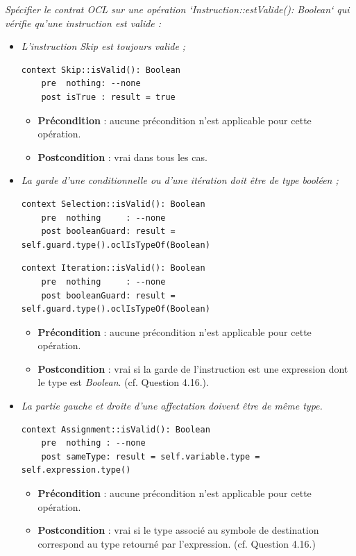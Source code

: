 \documentclass[oneside,a4paper]{book}
\begin{document}
\textit{Spécifier le contrat OCL sur une opération `Instruction::estValide(): Boolean` qui vérifie qu'une instruction est valide :}
\begin{itemize}
    \item \textit{L'instruction Skip est toujours valide ;}
        \begin{lstlisting}
context Skip::isValid(): Boolean
    pre  nothing: --none
    post isTrue : result = true
        \end{lstlisting}
        \begin{itemize}
            \item \textbf{Précondition} : aucune précondition n'est applicable pour cette opération.
            \item \textbf{Postcondition} : vrai dans tous les cas.
        \end{itemize}
    
    \item \textit{La garde d'une conditionnelle ou d'une itération doit être de type booléen ;}
        \begin{lstlisting}
context Selection::isValid(): Boolean
    pre  nothing     : --none
    post booleanGuard: result = self.guard.type().oclIsTypeOf(Boolean)
        \end{lstlisting}
        \begin{lstlisting}
context Iteration::isValid(): Boolean
    pre  nothing     : --none
    post booleanGuard: result = self.guard.type().oclIsTypeOf(Boolean)
        \end{lstlisting}
        \begin{itemize}
            \item \textbf{Précondition} : aucune précondition n'est applicable pour cette opération.
            \item \textbf{Postcondition} : vrai si la garde de l'instruction est une expression dont le type est \textit{Boolean}.\newline
            (cf. Question 4.16.).
        \end{itemize}
    
    \item \textit{La partie gauche et droite d'une affectation doivent être de même type.}
        \begin{lstlisting}
context Assignment::isValid(): Boolean
    pre  nothing : --none
    post sameType: result = self.variable.type = self.expression.type()
        \end{lstlisting}
        \begin{itemize}
            \item \textbf{Précondition} : aucune précondition n'est applicable pour cette opération.
            \item \textbf{Postcondition} : vrai si le type associé au symbole de destination correspond au type retourné par l'expression.\newline
            (cf. Question 4.16.)
        \end{itemize}
\end{itemize}
\end{document}
